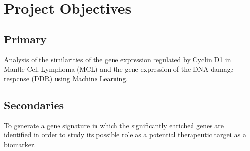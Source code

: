 
\section{Project Objectives}
\subsection{Primary}
Analysis of the similarities of the gene expression regulated by Cyclin D1 in Mantle Cell Lymphoma (MCL) and the gene expression of the DNA-damage response (DDR) using Machine Learning.

\subsection{Secondaries}
To generate a gene signature in which the significantly enriched genes are identified in order to study its possible role as a potential therapeutic target as a biomarker.
